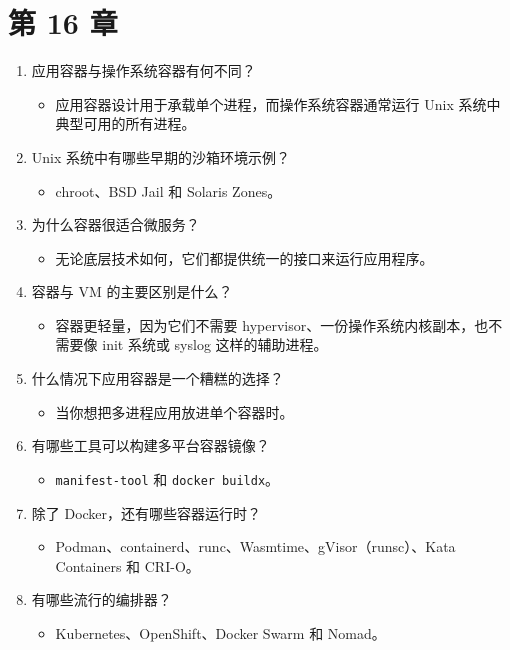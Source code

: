 \section*{第 16 章}

\begin{enumerate}
\item 应用容器与操作系统容器有何不同？

\begin{itemize}
\item 应用容器设计用于承载单个进程，而操作系统容器通常运行 Unix 系统中典型可用的所有进程。
\end{itemize}
\item Unix 系统中有哪些早期的沙箱环境示例？

\begin{itemize}
\item chroot、BSD Jail 和 Solaris Zones。
\end{itemize}
\item 为什么容器很适合微服务？

\begin{itemize}
\item 无论底层技术如何，它们都提供统一的接口来运行应用程序。
\end{itemize}
\item 容器与 VM 的主要区别是什么？

\begin{itemize}
\item 容器更轻量，因为它们不需要 hypervisor、一份操作系统内核副本，也不需要像 init 系统或 syslog 这样的辅助进程。
\end{itemize}
\item 什么情况下应用容器是一个糟糕的选择？

\begin{itemize}
\item 当你想把多进程应用放进单个容器时。
\end{itemize}
\item 有哪些工具可以构建多平台容器镜像？

\begin{itemize}
\item \texttt{manifest-tool} 和 \texttt{docker buildx}。
\end{itemize}
\item 除了 Docker，还有哪些容器运行时？

\begin{itemize}
\item Podman、containerd、runc、Wasmtime、gVisor（runsc）、Kata Containers 和 CRI-O。
\end{itemize}
\item 有哪些流行的编排器？

\begin{itemize}
\item Kubernetes、OpenShift、Docker Swarm 和 Nomad。
\end{itemize}
\end{enumerate}

